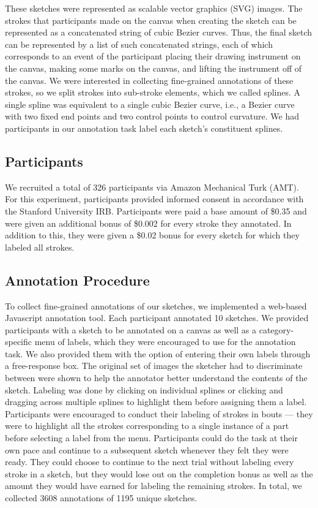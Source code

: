 \documentclass[10pt,letterpaper]{article}
\begin{document}
These sketches were represented as scalable vector graphics (SVG) images. 
The strokes that participants made on the canvas when creating the sketch can be represented as a concatenated string of cubic Bezier curves.  
Thus, the final sketch can be represented by a list of such concatenated strings, each of which corresponds to an event of the participant placing their drawing instrument on the canvas, making some marks on the canvas, and lifting the instrument off of the canvas. 
We were interested in collecting fine-grained annotations of these strokes, so we split strokes into sub-stroke elements, which we called splines. 
A single spline was equivalent to a single cubic Bezier curve, i.e., a Bezier curve with two fixed end points and two control points to control curvature. 
We had participants in our annotation task label each sketch's constituent splines.


\subsection{Participants}

We recruited a total of 326 participants via Amazon Mechanical Turk (AMT).  
For this experiment, participants provided informed consent in accordance with the Stanford University IRB. 
Participants were paid a base amount of \$0.35 and were given an additional bonus of \$0.002 for every stroke they annotated. 
In addition to this, they were given a \$0.02 bonus for every sketch for which they labeled all strokes. 

\subsection{Annotation Procedure}

To collect fine-grained annotations of our sketches, we implemented a web-based Javascript annotation tool. 
Each participant annotated 10 sketches. 
We provided participants with a sketch to be annotated on a canvas as well as a category-specific menu of labels, which they were encouraged to use for the annotation task. We also provided them with the option of entering their own labels through a free-response box. 
The original set of images the sketcher had to discriminate between were shown to help the annotator better understand the contents of the sketch.
Labeling was done by clicking on individual splines or clicking and dragging across multiple splines to highlight them before assigning them a label.
Participants were encouraged to conduct their labeling of strokes in bouts — they were to highlight all the strokes corresponding to a single instance of a part before selecting a label from the menu. 
Participants could do the task at their own pace and continue to a subsequent sketch whenever they felt they were ready. 
They could choose to continue to the next trial without labeling every stroke in a sketch, but they would lose out on the completion bonus as well as the amount they would have earned for labeling the remaining strokes.
\noindent In total, we collected 3608 annotations of 1195 unique sketches. 
\end{document}
